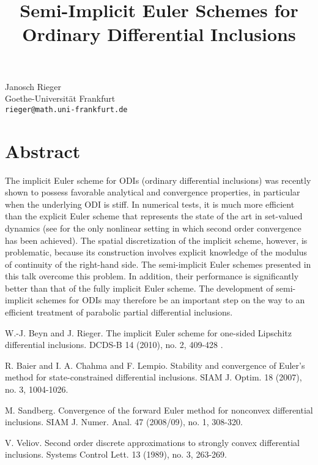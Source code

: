 \title{Semi-Implicit Euler Schemes for Ordinary Differential Inclusions}
\author{}  \institute{}
\maketitle
\begin{center}
{\large Janosch Rieger}\\
Goethe-Universit\"{a}t Frankfurt\\
{\tt rieger@math.uni-frankfurt.de}

\end{center}

\section*{Abstract}

The implicit Euler scheme for ODIs (ordinary differential inclusions) was recently shown to possess favorable
analytical and convergence properties, in particular when the underlying ODI
is stiff. In numerical tests, it is much more efficient than the explicit Euler scheme that represents the state of the art in set-valued dynamics (see \cite{veliov} for the only nonlinear setting in which second order convergence has been achieved). The spatial discretization of the implicit scheme, however, is problematic, because its construction involves explicit knowledge of the modulus of continuity of the right-hand side. The semi-implicit Euler schemes presented in this talk overcome this problem. In addition, their performance is significantly better than that of the fully implicit Euler scheme. The development of semi-implicit schemes for ODIs may therefore be an important step on the way to an efficient treatment of parabolic partial differential inclusions.


\begin{thebibliography}{10}

{\sc W.-J. Beyn and J. Rieger}. { The implicit Euler scheme for one-sided Lipschitz differential inclusions}. DCDS-B 14 (2010), no. 2, 409-428 .



{\sc R. Baier and I. A. Chahma and F. Lempio}. {Stability and convergence of Euler's method for state-constrained differential inclusions}. SIAM J. Optim.  18  (2007),  no. 3, 1004-1026.



{\sc M. Sandberg}. {Convergence of the forward Euler method for nonconvex differential inclusions}. SIAM J. Numer. Anal.  47  (2008/09),  no. 1, 308-320.



{\sc V. Veliov}. {Second order discrete approximations to strongly convex differential inclusions}. Systems Control Lett.  13  (1989),  no. 3, 263-269.

\end{thebibliography}
